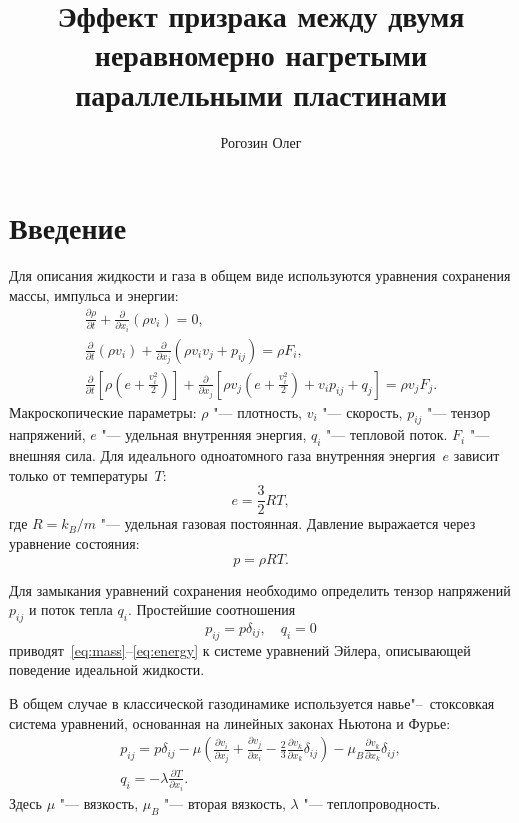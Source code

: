 \documentclass[english,russian,a4paper,12pt]{article}
\title{Эффект призрака между двумя неравномерно нагретыми параллельными пластинами}
\author{Рогозин Олег}
\newcommand{\pder}[2][]{\frac{\partial#1}{\partial#2}}
\begin{document}
\maketitle
\tableofcontents

\section{Введение}

Для описания жидкости и газа в общем виде используются уравнения сохранения массы, импульса и энергии:
\begin{gather}
	\pder[\rho]{t} + \pder{x_i}(\rho v_i) = 0, \label{eq:mass}\\
	\pder{t}(\rho v_i) + \pder{x_j}(\rho v_i v_j + p_{ij}) = \rho F_i, \label{eq:momentum}\\
	\pder{t}\left[\rho\left(e+\frac{v_i^2}2\right)\right] +
		\pder{x_j}\left[\rho v_j\left(e+\frac{v_i^2}2\right)+v_i p_{ij}+q_j\right] = \rho v_j F_j. \label{eq:energy}
\end{gather}
Макроскопические параметры: \(\rho\) "--- плотность, \(v_i\) "--- скорость, \(p_{ij}\) "--- тензор напряжений,
\(e\) "--- удельная внутренняя энергия, \(q_i\) "--- тепловой поток. \(F_i\) "--- внешняя сила.
Для идеального одноатомного газа внутренняя энергия~\(e\) зависит только от температуры~\(T\):
\[ e = \frac32RT,\]
где \(R=k_B/m\) "--- удельная газовая постоянная. Давление выражается через уравнение состояния:
\[ p = \rho RT. \]

Для замыкания уравнений сохранения необходимо определить 
тензор напряжений \(p_{ij}\) и поток тепла \(q_i\).
Простейшие соотношения
\begin{equation}
	p_{ij} = p\delta_{ij}, \quad q_i = 0
\end{equation}
приводят~\eqref{eq:mass}--\eqref{eq:energy} к системе уравнений Эйлера,
описывающей поведение идеальной жидкости.

В общем случае в классической газодинамике используется навье"--~стоксовкая система уравнений,
основанная на линейных законах Ньютона и Фурье:
\begin{gather}
	p_{ij} = p\delta_{ij} - \mu\left(\pder[v_i]{x_j}+\pder[v_j]{x_i}-\frac23\pder[v_k]{x_k}\delta_{ij}\right) -
		\mu_B\pder[v_k]{x_k}\delta_{ij}, \label{eq:stress_tensor}\\
	q_i = -\lambda\pder[T]{x_i}. \label{eq:heat_flow}
\end{gather}
Здесь \(\mu\) "--- вязкость, \(\mu_B\) "--- вторая вязкость, \(\lambda\) "--- теплопроводность.
\end{document}
